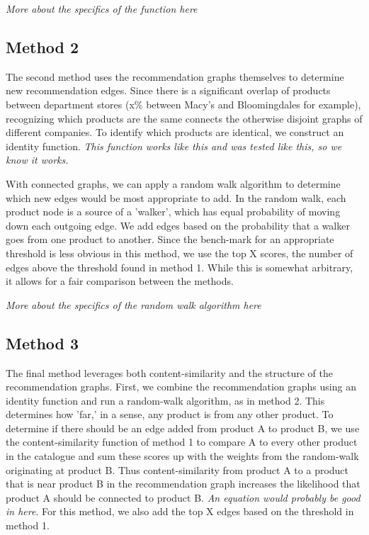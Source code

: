 \documentclass[10pt]{article}
\begin{document}
\emph{More about the specifics of the function here}

\subsection*{Method 2}
The second method uses the recommendation graphs themselves to determine new
recommendation edges. Since there is a significant overlap of products
between department stores (x\% between Macy's and Bloomingdales for example),
        recognizing which products are the same connects the otherwise disjoint
        graphs of different companies. To identify which products are identical, we
        construct an identity function. \emph{This function works like this and was
            tested like this, so we know it works.}

            With connected graphs, we can apply a random walk algorithm to determine
            which new edges would be most appropriate to add. In the random walk, each
            product node is a source of a 'walker', which has equal probability of
            moving down each outgoing edge. We add edges based on the probability that a
            walker goes from one product to another. Since the bench-mark for an
            appropriate threshold is less obvious in this method, we use the top X
            scores, the number of edges above the threshold found in method 1. While
            this is somewhat arbitrary, it allows for a fair comparison between the
            methods.

            \emph{More about the specifics of the random walk algorithm here}

            \subsection*{Method 3}
            The final method leverages both content-similarity and the structure of the
            recommendation graphs. First, we combine the recommendation graphs using an
            identity function and run a random-walk algorithm, as in method 2. This
            determines how 'far,' in a sense, any product is from any other product. To
            determine if there should be an edge added from product A to product B, we
            use the content-similarity function of method 1 to compare A to every other
            product in the catalogue and sum these scores up with the weights from the
            random-walk originating at product B. Thus content-similarity from product A
            to a product that is near product B in the recommendation graph increases
            the likelihood that product A should be connected to product B. \emph{An equation
                would probably be good in here}. For this method, we also add the top X
                edges based on the threshold in method 1.
\end{document}
